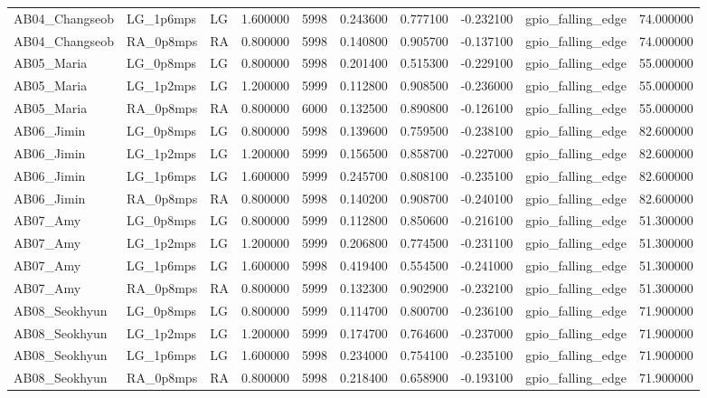 \begin{table}
\begin{tabular}{lllrrrrrlr}
AB04\_Changseob & LG\_1p6mps & LG & 1.600000 & 5998 & 0.243600 & 0.777100 & -0.232100 & gpio\_falling\_edge & 74.000000 \\
AB04\_Changseob & RA\_0p8mps & RA & 0.800000 & 5998 & 0.140800 & 0.905700 & -0.137100 & gpio\_falling\_edge & 74.000000 \\
AB05\_Maria & LG\_0p8mps & LG & 0.800000 & 5998 & 0.201400 & 0.515300 & -0.229100 & gpio\_falling\_edge & 55.000000 \\
AB05\_Maria & LG\_1p2mps & LG & 1.200000 & 5999 & 0.112800 & 0.908500 & -0.236000 & gpio\_falling\_edge & 55.000000 \\
AB05\_Maria & RA\_0p8mps & RA & 0.800000 & 6000 & 0.132500 & 0.890800 & -0.126100 & gpio\_falling\_edge & 55.000000 \\
AB06\_Jimin & LG\_0p8mps & LG & 0.800000 & 5998 & 0.139600 & 0.759500 & -0.238100 & gpio\_falling\_edge & 82.600000 \\
AB06\_Jimin & LG\_1p2mps & LG & 1.200000 & 5999 & 0.156500 & 0.858700 & -0.227000 & gpio\_falling\_edge & 82.600000 \\
AB06\_Jimin & LG\_1p6mps & LG & 1.600000 & 5999 & 0.245700 & 0.808100 & -0.235100 & gpio\_falling\_edge & 82.600000 \\
AB06\_Jimin & RA\_0p8mps & RA & 0.800000 & 5998 & 0.140200 & 0.908700 & -0.240100 & gpio\_falling\_edge & 82.600000 \\
AB07\_Amy & LG\_0p8mps & LG & 0.800000 & 5999 & 0.112800 & 0.850600 & -0.216100 & gpio\_falling\_edge & 51.300000 \\
AB07\_Amy & LG\_1p2mps & LG & 1.200000 & 5999 & 0.206800 & 0.774500 & -0.231100 & gpio\_falling\_edge & 51.300000 \\
AB07\_Amy & LG\_1p6mps & LG & 1.600000 & 5998 & 0.419400 & 0.554500 & -0.241000 & gpio\_falling\_edge & 51.300000 \\
AB07\_Amy & RA\_0p8mps & RA & 0.800000 & 5999 & 0.132300 & 0.902900 & -0.232100 & gpio\_falling\_edge & 51.300000 \\
AB08\_Seokhyun & LG\_0p8mps & LG & 0.800000 & 5999 & 0.114700 & 0.800700 & -0.236100 & gpio\_falling\_edge & 71.900000 \\
AB08\_Seokhyun & LG\_1p2mps & LG & 1.200000 & 5999 & 0.174700 & 0.764600 & -0.237000 & gpio\_falling\_edge & 71.900000 \\
AB08\_Seokhyun & LG\_1p6mps & LG & 1.600000 & 5998 & 0.234000 & 0.754100 & -0.235100 & gpio\_falling\_edge & 71.900000 \\
AB08\_Seokhyun & RA\_0p8mps & RA & 0.800000 & 5998 & 0.218400 & 0.658900 & -0.193100 & gpio\_falling\_edge & 71.900000 \\
\bottomrule
\end{tabular}
\end{table}
